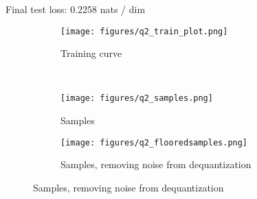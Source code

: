 \documentclass{article}
\begin{document}
Final test loss: 0.2258  nats / dim
\begin{figure}[H]
    \centering
    \begin{subfigure}{0.45\textwidth}
        \centering
        \texttt{[image: figures/q2\_train\_plot.png]}
        \caption{Training curve}
    \end{subfigure}
    \\
    \begin{subfigure}{0.48\textwidth}
        \centering
        \texttt{[image: figures/q2\_samples.png]}
        \caption{Samples}
    \end{subfigure}
    \begin{subfigure}{0.48\textwidth}
        \centering
        \texttt{[image: figures/q2\_flooredsamples.png]}
        \caption{Samples, removing noise from dequantization}
    \end{subfigure}
\end{figure}

\newpage
{}
\end{document}
